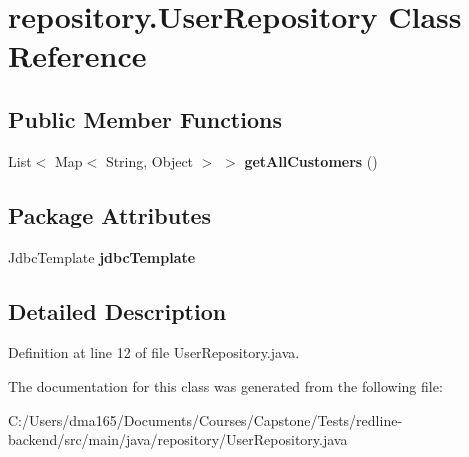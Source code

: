 \hypertarget{classrepository_1_1_user_repository}{}\section{repository.\+User\+Repository Class Reference}
\label{classrepository_1_1_user_repository}
\subsection*{Public Member Functions}
\begin{DoxyCompactItemize}
\item 
\mbox{\label{classrepository_1_1_user_repository_a040d7b9751543f8e9488c456dd4c86f1}} 
List$<$ Map$<$ String, Object $>$ $>$ {\bfseries get\+All\+Customers} ()
\end{DoxyCompactItemize}
\subsection*{Package Attributes}
\begin{DoxyCompactItemize}
\item 
\mbox{\label{classrepository_1_1_user_repository_ac9412ba26edde42edf6817d387ce964c}} 
Jdbc\+Template {\bfseries jdbc\+Template}
\end{DoxyCompactItemize}


\subsection{Detailed Description}


Definition at line 12 of file User\+Repository.\+java.



The documentation for this class was generated from the following file\+:\begin{DoxyCompactItemize}
\item 
C\+:/\+Users/dma165/\+Documents/\+Courses/\+Capstone/\+Tests/redline-\/backend/src/main/java/repository/User\+Repository.\+java\end{DoxyCompactItemize}
